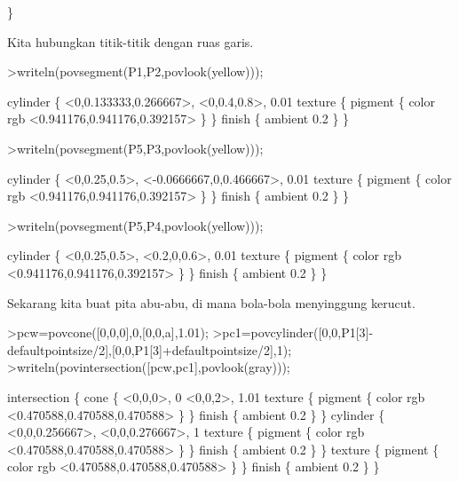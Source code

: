 \documentclass[a4paper,10pt]{article}
\begin{document}
\begin{eulernotebook}
\begin{eulercomment}
\begin{eulercomment}
\begin{eulercomment}
\begin{eulercomment}
\begin{eulercomment}
\begin{eulercomment}
\begin{eulercomment}
\begin{eulercomment}
\begin{eulercomment}
\begin{eulercomment}
\begin{eulercomment}
\begin{eulercomment}
\begin{eulercomment}
\begin{eulercomment}
\begin{eulercomment}
\begin{eulercomment}
\begin{euleroutput}
  \}
\end{euleroutput}
\begin{eulercomment}
Kita hubungkan titik-titik dengan ruas garis.
\end{eulercomment}
\begin{eulerprompt}
>writeln(povsegment(P1,P2,povlook(yellow)));
\end{eulerprompt}
\begin{euleroutput}
  cylinder \{ <0,0.133333,0.266667>, <0,0.4,0.8>, 0.01
   texture \{ pigment \{ color rgb <0.941176,0.941176,0.392157> \}  \} 
   finish \{ ambient 0.2 \} 
   \}
\end{euleroutput}
\begin{eulerprompt}
>writeln(povsegment(P5,P3,povlook(yellow)));
\end{eulerprompt}
\begin{euleroutput}
  cylinder \{ <0,0.25,0.5>, <-0.0666667,0,0.466667>, 0.01
   texture \{ pigment \{ color rgb <0.941176,0.941176,0.392157> \}  \} 
   finish \{ ambient 0.2 \} 
   \}
\end{euleroutput}
\begin{eulerprompt}
>writeln(povsegment(P5,P4,povlook(yellow)));
\end{eulerprompt}
\begin{euleroutput}
  cylinder \{ <0,0.25,0.5>, <0.2,0,0.6>, 0.01
   texture \{ pigment \{ color rgb <0.941176,0.941176,0.392157> \}  \} 
   finish \{ ambient 0.2 \} 
   \}
\end{euleroutput}
\begin{eulercomment}
Sekarang kita buat pita abu-abu, di mana bola-bola menyinggung kerucut.
\end{eulercomment}
\begin{eulerprompt}
>pcw=povcone([0,0,0],0,[0,0,a],1.01);
>pc1=povcylinder([0,0,P1[3]-defaultpointsize/2],[0,0,P1[3]+defaultpointsize/2],1);
>writeln(povintersection([pcw,pc1],povlook(gray)));
\end{eulerprompt}
\begin{euleroutput}
  intersection \{ cone \{ <0,0,0>, 0 <0,0,2>, 1.01 texture \{ pigment \{ color rgb <0.470588,0.470588,0.470588> \}  \} 
   finish \{ ambient 0.2 \} 
   \}
  cylinder \{ <0,0,0.256667>, <0,0,0.276667>, 1
   texture \{ pigment \{ color rgb <0.470588,0.470588,0.470588> \}  \} 
   finish \{ ambient 0.2 \} 
   \}
   texture \{ pigment \{ color rgb <0.470588,0.470588,0.470588> \}  \} 
   finish \{ ambient 0.2 \} 
   \}
\end{euleroutput}
\begin{eulerprompt}

\end{eulerprompt}
\end{eulercomment}
\end{eulercomment}
\end{eulercomment}
\end{eulercomment}
\end{eulercomment}
\end{eulercomment}
\end{eulercomment}
\end{eulercomment}
\end{eulercomment}
\end{eulercomment}
\end{eulercomment}
\end{eulercomment}
\end{eulercomment}
\end{eulercomment}
\end{eulercomment}
\end{eulercomment}
\end{eulernotebook}
\end{document}
